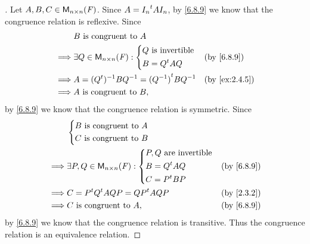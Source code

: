 \begin{proof}[]
  Let \(A, B, C \in \ms[n][n][\F]\).
  Since \(A = {I_n}^{t} A I_n\), by \cref{6.8.9} we know that the congruence relation is reflexive.
  Since
  \begin{align*}
             & B \text{ is congruent to } A                                           \\
    \implies & \exists Q \in \ms[n][n][\F] : \begin{dcases}
                                               Q \text{ is invertible} \\
                                               B = \tp{Q} A Q
                                             \end{dcases}        &  & \by{6.8.9}      \\
    \implies & A = (\tp{Q})^{-1} B Q^{-1} = \tp{(Q^{-1})} B Q^{-1} &  & \by{ex:2.4.5} \\
    \implies & A \text{ is congruent to } B,
  \end{align*}
  by \cref{6.8.9} we know that the congruence relation is symmetric.
  Since
  \begin{align*}
             & \begin{dcases}
                 B \text{ is congruent to } A \\
                 C \text{ is congruent to } B
               \end{dcases}                                    \\
    \implies & \exists P, Q \in \ms[n][n][\F] : \begin{dcases}
                                                  P, Q \text{ are invertible} \\
                                                  B = \tp{Q} A Q              \\
                                                  C = \tp{P} B P
                                                \end{dcases} &  & \by{6.8.9}   \\
    \implies & C = \tp{P} \tp{Q} A Q P = \tp{QP} A QP          &  & \by{2.3.2} \\
    \implies & C \text{ is congruent to } A,                   &  & \by{6.8.9}
  \end{align*}
  by \cref{6.8.9} we know that the congruence relation is transitive.
  Thus the congruence relation is an equivalence relation.
\end{proof}


